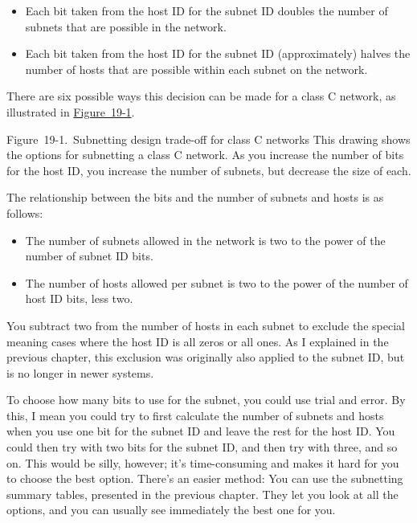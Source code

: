 \begin{itemize}
\item
  Each bit taken from the host ID for the subnet ID doubles the number
  of subnets that are possible in the network.
\item
  Each bit taken from the host ID for the subnet ID (approximately)
  halves the number of hosts that are possible within each subnet on the
  network.
\end{itemize}

There are six possible ways this decision can be made for a class C
network, as illustrated in
\protect\hyperlink{ch19s02.htmlux5cux23subnetting_design_trade-off_for_class_c_}{Figure~19-1}.

\protect\hypertarget{ch19s02.htmlux5cux23subnetting_design_trade-off_for_class_c_}{}{}

\protect\hypertarget{ch19s02.htmlux5cux23I_mediaobject5_d1e20630}{}{}

Figure~19-1.~Subnetting design trade-off for class C networks This
drawing shows the options for subnetting a class C network. As you
increase the number of bits for the host ID, you increase the number of
subnets, but decrease the size of each.

The relationship between the bits and the number of subnets and hosts is
as follows:

\begin{itemize}
\item
  The number of subnets allowed in the network is two to the power of
  the number of subnet ID bits.
\item
  The number of hosts allowed per subnet is two to the power of the
  number of host ID bits, less two.
\end{itemize}

You subtract two from the number of hosts in each subnet to exclude the
special meaning cases where the host ID is all zeros or all ones. As I
explained in the previous chapter, this exclusion was originally also
applied to the subnet ID, but is no longer in newer systems.

To choose how many bits to use for the subnet, you could use trial and
error. By this, I mean you could try to first calculate the number of
subnets and hosts when you use one bit for the subnet ID and leave the
rest for the host ID. You could then try with two bits for the subnet
ID, and then try with three, and so on. This would be silly, however;
it's time-consuming and makes it hard for you to choose the best option.
There's an easier method: You can use the subnetting summary tables,
presented in the previous chapter. They let you look at all the options,
and you can usually see immediately the best one for you.

